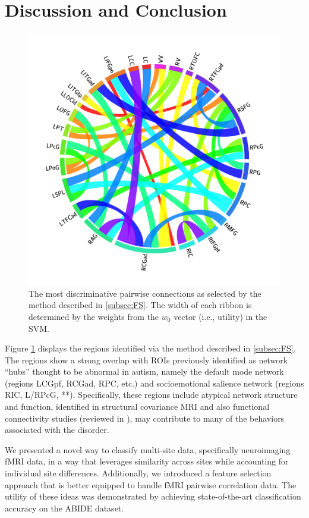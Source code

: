 \documentclass{llncs}
\begin{document}
\section{Discussion and Conclusion}
 \begin{figure}[ht]
	\centering
	\includegraphics[scale = .15]{now_circos3.png}
	\caption{The most discriminative pairwise connections as selected by the method described in \ref{subsec:FS}.  The width of each ribbon is determined by the weights from the $w_0$ vector (i.e., utility) in the SVM. }
	\label{fig:circos}
\end{figure}

Figure \ref{fig:circos} displays the regions identified via the method described in  \ref{subsec:FS}.  The regions show a strong overlap with ROIs previously identified as network “hubs” thought to be abnormal in autism, namely the default mode network (regions LCGpf, RCGad, RPC, etc.)  and socioemotional salience network (regions RIC, L/RPcG,  **).  Specifically, these regions include  atypical network structure and function, identified in structural covariance MRI \cite{zielinski2012scmri} and also functional connectivity studies (reviewed in \cite{jeff2014}), may contribute to many of the behaviors associated with the disorder.

We presented a novel way to classify multi-site data, specifically neuroimaging fMRI data, in a way that leverages similarity across sites while accounting for individual site differences.  Additionally, we introduced a feature selection approach that is better equipped to handle fMRI pairwise correlation data.  The utility of these ideas was demonstrated by achieving state-of-the-art  classification accuracy on the ABIDE dataset. 


{}

\end{document}
